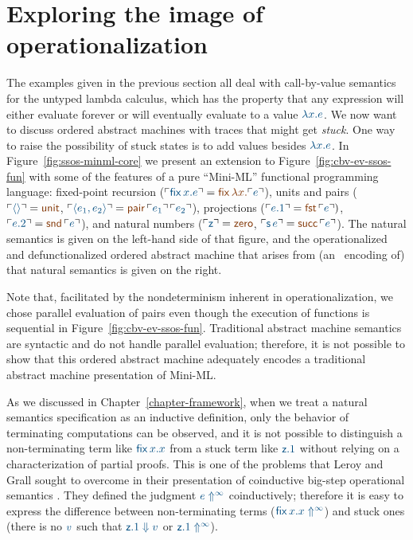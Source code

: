 \section{Exploring the image of operationalization}
\label{sec:absmachine-nondeterminism}

The examples given in the previous section all deal
with call-by-value semantics for the untyped lambda calculus, which
has the property that any expression will either evaluate forever or
will eventually evaluate to a value $\obj{\lambda x. e}$. We now want to
discuss ordered abstract machines with traces
that might get {\it stuck}. One way to raise the possibility of stuck
states is to add values besides $\obj{\lambda x.e}$. In
Figure~\ref{fig:ssos-minml-core} we present an extension to
Figure~\ref{fig:cbv-ev-ssos-fun} with some of the features of a pure
``Mini-ML'' functional programming language: fixed-point recursion
($\interp{{\sf fix}\,x.e} = \lf{{\sf fix}\,\lambda x.\interp{e}}$),
units and pairs ($\interp{\langle\rangle} = \lf{\sf unit}$,
$\interp{\langle e_1, e_2 \rangle} = \lf{{\sf
  pair}\,\interp{e_1}\,\interp{e_2}}$), projections ($\interp{e.1} =
\lf{{\sf fst}\,\interp{e}})$, $\interp{e.2} = \lf{{\sf snd}\,\interp{e}}$), and
natural numbers ($\interp{{\sf z}} = \lf{{\sf zero}}$, $\interp{{\sf s}\,e}
= \lf{{\sf succ}\,\interp{e}}$).  The natural semantics is given on the
left-hand side of that figure, and the operationalized and
defunctionalized ordered abstract machine that arises from (an
\sls~encoding of) that natural semantics is given on the right.


Note that, facilitated by the nondeterminism inherent in
operationalization, we chose parallel evaluation of pairs even though
the execution of functions is sequential in
Figure~\ref{fig:cbv-ev-ssos-fun}.  Traditional abstract machine
semantics are syntactic and do not handle parallel evaluation;
therefore, it is not possible to show that this ordered abstract
machine adequately encodes a traditional abstract machine presentation
of Mini-ML.

As we discussed in Chapter~\ref{chapter-framework}, 
when we treat a natural semantics
specification as an inductive definition, only the behavior of
terminating computations can be observed, and it is not possible to
distinguish a non-terminating term like $\obj{{\sf fix}\,x.x}$ from a
stuck term like $\obj{{\sf z}.1}$ without relying on a
characterization of partial proofs.  This is one of the problems that
Leroy and Grall sought to overcome in their presentation of
coinductive big-step operational semantics
\cite{leroy09coinductive}. They defined the judgment $\obj{e
  \Uparrow^\infty}$ coinductively; therefore it is easy to express the
difference between non-terminating terms ($\obj{{\sf fix}\,x.x
  \Uparrow^\infty}$) and stuck ones (there is no $\obj{v}$ such that
$\obj{{\sf z}.1 \Downarrow v}$ or $\obj{{\sf z}.1 \Uparrow^\infty}$).

